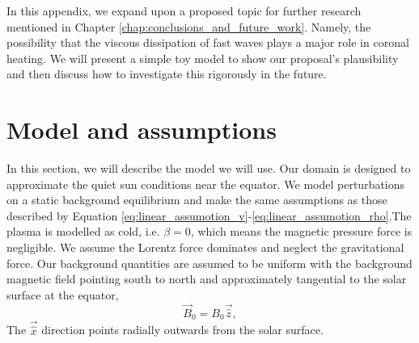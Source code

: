 In this appendix, we expand upon a proposed topic for further research mentioned in Chapter \ref{chap:conclusions_and_future_work}. Namely, the possibility that the viscous dissipation of fast waves plays a major role in coronal heating. We will present a simple toy model to show our proposal's plausibility and then discuss how to investigate this rigorously in the future.

\section{Model and assumptions}

In this section, we will describe the model we will use. Our domain is designed to approximate the quiet sun conditions near the equator. We model perturbations on a static background equilibrium and make the same assumptions as those described by Equation \eqref{eq:linear_assumotion_v}-\eqref{eq:linear_assumotion_rho}.The plasma is modelled as cold, i.e. $\beta=0$, which means the magnetic pressure force is negligible. We assume the Lorentz force dominates and neglect the gravitational force. Our background quantities are assumed to be uniform with the background magnetic field pointing south to north and approximately tangential to the solar surface at the equator,
\begin{equation}
    \vec{B}_0 = B_0\vec{\hat{z}},
\end{equation}
The $\vec{\hat{x}}$ direction points radially outwards from the solar surface.

